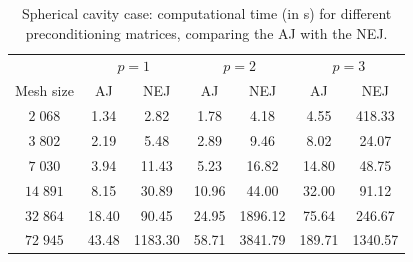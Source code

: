 \documentclass[review,3p]{elsarticle}
\begin{document}
\begin{table}[h]
	\centering
	\begin{tabular}{ccccccc}
		\multicolumn{1}{l}{} & \multicolumn{2}{c}{$p=1$} & \multicolumn{2}{c}{$p=2$} & \multicolumn{2}{c}{$p=3$} \\
		Mesh size             & AJ          & NEJ           & AJ          & NEJ           & AJ          & NEJ        \\ \hline
		$2\;068$                  & 1.34           & 2.82            & 1.78           & 4.18          & 4.55         &  418.33        \\
		$3\;802$                 & 2.19           & 5.48            & 2.89           & 9.46         & 8.02      &  24.07             \\
		$7\;030$                  & 3.94           & 11.43            & 5.23           & 16.82       & 14.80         &  48.75           \\
		$14\;891$                  & 8.15           & 30.89            & 10.96           & 44.00        & 32.00    &   91.12              \\
		$32\;864$                 & 18.40           & 90.45            & 24.95           & 1896.12         & 75.64  &   246.67                 \\
		$72\;945$                 & 43.48          & 1183.30          & 58.71         & 3841.79        & 189.71 &  1340.57              \\ \hline
	\end{tabular}
	\caption{Spherical cavity case: computational time (in s) for different preconditioning matrices, comparing the AJ with the NEJ.}
	\label{tab:AJvsTJ-SC}
\end{table}
%
%
%
%
\end{document}
